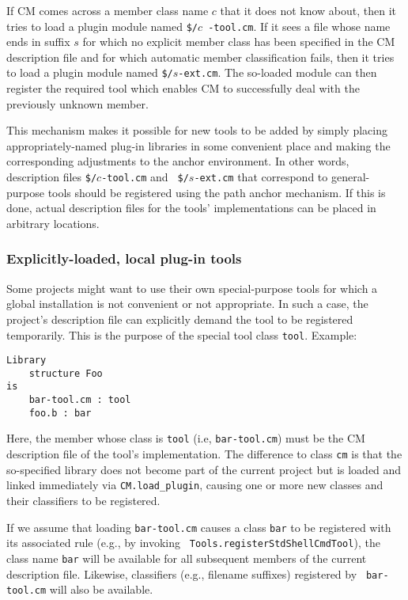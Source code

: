 \documentclass[titlepage,letterpaper]{article}
\begin{document}
If CM comes across a member class name $c$ that it does not know
about, then it tries to load a plugin module named {\tt \$/}$c${\tt
-tool.cm}.  If it sees a file whose name ends in suffix $s$ for which
no explicit member class has been specified in the CM description file
and for which automatic member classification fails, then it tries to
load a plugin module named {\tt \$/}$s${\tt -ext.cm}.  The so-loaded
module can then register the required tool which enables CM to
successfully deal with the previously unknown member.

This mechanism makes it possible for new tools to be added by simply
placing appropriately-named plug-in libraries in some convenient place
and making the corresponding adjustments to the anchor environment.
In other words, description files {\tt \$/}$c${\tt -tool.cm} and {\tt
\$/}$s${\tt -ext.cm} that correspond to general-purpose tools should
be registered using the path anchor mechanism.  If this is done,
actual description files for the tools' implementations can be placed
in arbitrary locations.

\subsubsection{Explicitly-loaded, local plug-in tools}
\label{sec:localtools}

Some projects might want to use their own special-purpose tools for
which a global installation is not convenient or not appropriate.  In
such a case, the project's description file can explicitly demand the
tool to be registered temporarily.  This is the purpose of the special
tool class {\tt tool}.  Example:

\begin{verbatim}
Library
    structure Foo
is
    bar-tool.cm : tool
    foo.b : bar
\end{verbatim}

Here, the member whose class is {\tt tool} (i.e, {\tt bar-tool.cm})
must be the CM description file of the tool's implementation.  The
difference to class {\tt cm} is that the so-specified library does not
become part of the current project but is loaded and linked
immediately via {\tt CM.load\_plugin}, causing one or more new classes
and their classifiers to be registered.

If we assume that loading {\tt bar-tool.cm} causes a class {\tt bar}
to be registered with its associated rule (e.g., by invoking {\tt
Tools.registerStdShellCmdTool}), the class name {\tt bar} will be
available for all subsequent members of the current description file.
Likewise, classifiers (e.g., filename suffixes) registered by {\tt
bar-tool.cm} will also be available.
\end{document}
